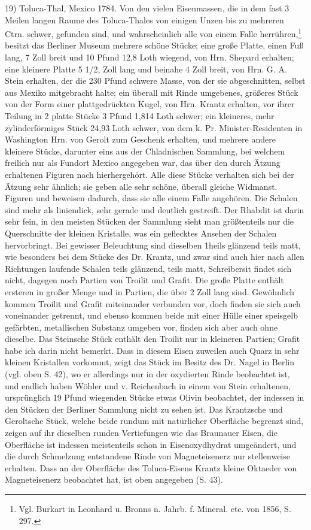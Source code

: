 \documentclass[a4paper, 11pt, oneside]{article}
\begin{document}
19) Toluca-Thal, Mexico 1784. Von den vielen Eisenmassen, die in dem fast 3 Meilen langen Raume des Toluca-Thales von einigen Unzen bis zu mehreren Ctrn. schwer, gefunden sind, und wahrscheinlich alle von einem Falle herrühren,\footnote{Vgl. Burkart in Leonhard u. Bronns n. Jahrb. f. Mineral. etc. von 1856, S. 297.} besitzt das Berliner Museum mehrere schöne Stücke; eine große Platte, einen Fuß lang, 7 Zoll breit und 10 Pfund 12,8 Loth wiegend, von Hrn. Shepard erhalten; eine kleinere Platte 5 1/2, Zoll lang und beinahe 4 Zoll breit, von Hrn. G. A. Stein erhalten, der die 230 Pfund schwere Masse, von der sie abgeschnitten, selbst aus Mexiko mitgebracht halte; ein überall mit Rinde umgebenes, größeres Stück von der Form einer plattgedrückten Kugel, von Hrn. Krantz erhalten, vor ihrer Teilung in 2 platte Stücke 3 Pfund 1,814 Loth schwer; ein kleineres, mehr zylinderförmiges Stück 24,93 Loth schwer, von dem k. Pr. Minister-Residenten in Washington Hrn. von Gerolt zum Geschenk erhalten, und mehrere andere kleinere Stücke, darunter eins aus der Chladnischen Sammlung, bei welchem freilich nur als Fundort Mexico angegeben war, das über den durch Ätzung erhaltenen Figuren nach hierhergehört. Alle diese Stücke verhalten sich bei der Ätzung sehr ähnlich; sie geben alle sehr schöne, überall gleiche Widmanst. Figuren und beweisen dadurch, dass sie alle einem Falle angehören. Die Schalen sind mehr als liniendick, sehr gerade und deutlich gestreift. Der Rhabdit ist darin sehr fein, in den meisten Stücken der Sammlung sieht man größtenteils nur die Querschnitte der kleinen Kristalle, was ein geflecktes Ansehen der Schalen hervorbringt. Bei gewisser Beleuchtung sind dieselben 1heils glänzend teils matt, wie besonders bei dem Stücke des Dr. Krantz, und zwar sind auch hier nach allen Richtungen laufende Schalen teils glänzend, teils matt, Schreibersit findet sich nicht, dagegen noch Partien von Troilit und Grafit. Die große Platte enthält ersteren in großer Menge und in Partien, die über 2 Zoll lang sind. Gewöhnlich kommen Troilit und Grafit miteinander verbunden vor, doch finden sie sich auch voneinander getrennt, und ebenso kommen beide mit einer Hülle einer speisgelb gefärbten, metallischen Substanz umgeben vor, finden sich aber auch ohne dieselbe. Das Steinsche Stück enthält den Troilit nur in kleineren Partien; Grafit habe ich darin nicht bemerkt. Dass in diesem Eisen zuweilen auch Quarz in sehr kleinen Kristallen vorkommt, zeigt das Stück im Besitz des Dr. Nagel in Berlin (vgl. oben S. 42), wo er allerdings nur in der oxydierten Rinde beobachtet ist, und endlich haben Wöhler und v. Reichenbach in einem von Stein erhaltenen, ursprünglich 19 Pfund wiegenden Stücke etwas Olivin beobachtet, der indessen in den Stücken der Berliner Sammlung nicht zu sehen ist. Das Krantzsche und Geroltsche Stück, welche beide rundum mit natürlicher Oberfläche begrenzt sind, zeigen auf ihr dieselben runden Vertiefungen wie das Braunauer Eisen, die Oberfläche ist indessen meistenteils schon in Eisenoxydhydrat umgeändert, und die durch Schmelzung entstandene Rinde von Magneteisenerz nur stellenweise erhalten. Dass an der Oberfläche des Toluca-Eisens Krantz kleine Oktaeder von Magneteisenerz beobachtet hat, ist oben angegeben (S. 43).
\end{document}
